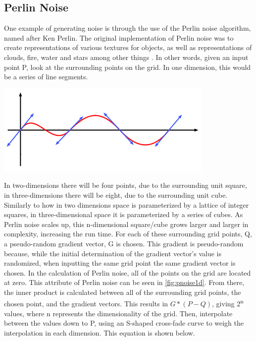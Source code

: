 \documentclass[10pt]{report}
\begin{document}
			\subsection{Perlin Noise}
		
				One example of generating noise is through the use of the Perlin noise algorithm, named after Ken Perlin. The original implementation of Perlin noise was to create representations of various textures for objects, as well as representations of clouds, fire, water and stars among other things \cite{10.1145/325165.325247}. In other words, given an input point P, look at the surrounding points on the grid. In one dimension, this would be a series of line segments. 
				
				\begin{minipage}{\textwidth}
					\centering
					\includegraphics[scale=.5]{noise-value-vs-perlin3}
					\label{fig:pnoise1d}
				\end{minipage} 
				
				In two-dimensions there will be four points, due to the surrounding unit square, in three-dimensions there will be eight, due to the surrounding unit cube. Similarly to how in two dimensions space is parameterized by a lattice of integer squares, in three-dimensional space it is parameterized by a series of cubes. As Perlin noise scales up, this n-dimensional square/cube grows larger and larger in complexity, increasing the run time. For each of these surrounding grid points, Q, a pseudo-random gradient vector, G is chosen. This gradient is pseudo-random because, while the initial determination of the gradient vector's value is randomized, when inputting the same grid point the same gradient vector is chosen. In the calculation of Perlin noise, all of the points on the grid are located at zero. This attribute of Perlin noise can be seen in \autoref{fig:pnoise1d}. From there, the inner product is calculated between all of the surrounding grid points, the chosen point, and the gradient vectors. This results in \(G * (P - Q)\), giving 2\textsuperscript{n} values, where n represents the dimensionality of the grid. Then, interpolate between the values down to P, using an S-shaped cross-fade curve to weigh the interpolation in each dimension. This equation is shown below.
				
\end{document}
